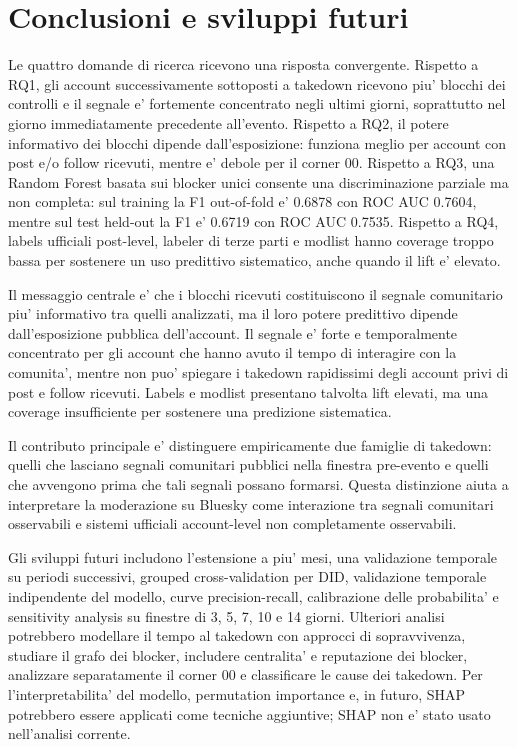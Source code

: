 \section{Conclusioni e sviluppi futuri}

Le quattro domande di ricerca ricevono una risposta convergente. Rispetto a RQ1, gli account successivamente sottoposti a takedown ricevono piu' blocchi dei controlli e il segnale e' fortemente concentrato negli ultimi giorni, soprattutto nel giorno immediatamente precedente all'evento. Rispetto a RQ2, il potere informativo dei blocchi dipende dall'esposizione: funziona meglio per account con post e/o follow ricevuti, mentre e' debole per il corner 00. Rispetto a RQ3, una Random Forest basata sui blocker unici consente una discriminazione parziale ma non completa: sul training la F1 out-of-fold e' \num{0.6878} con ROC AUC \num{0.7604}, mentre sul test held-out la F1 e' \num{0.6719} con ROC AUC \num{0.7535}. Rispetto a RQ4, labels ufficiali post-level, labeler di terze parti e modlist hanno coverage troppo bassa per sostenere un uso predittivo sistematico, anche quando il lift e' elevato.

Il messaggio centrale e' che i blocchi ricevuti costituiscono il segnale comunitario piu' informativo tra quelli analizzati, ma il loro potere predittivo dipende dall'esposizione pubblica dell'account. Il segnale e' forte e temporalmente concentrato per gli account che hanno avuto il tempo di interagire con la comunita', mentre non puo' spiegare i takedown rapidissimi degli account privi di post e follow ricevuti. Labels e modlist presentano talvolta lift elevati, ma una coverage insufficiente per sostenere una predizione sistematica.

Il contributo principale e' distinguere empiricamente due famiglie di takedown: quelli che lasciano segnali comunitari pubblici nella finestra pre-evento e quelli che avvengono prima che tali segnali possano formarsi. Questa distinzione aiuta a interpretare la moderazione su Bluesky come interazione tra segnali comunitari osservabili e sistemi ufficiali account-level non completamente osservabili.

Gli sviluppi futuri includono l'estensione a piu' mesi, una validazione temporale su periodi successivi, grouped cross-validation per DID, validazione temporale indipendente del modello, curve precision-recall, calibrazione delle probabilita' e sensitivity analysis su finestre di 3, 5, 7, 10 e 14 giorni. Ulteriori analisi potrebbero modellare il tempo al takedown con approcci di sopravvivenza, studiare il grafo dei blocker, includere centralita' e reputazione dei blocker, analizzare separatamente il corner 00 e classificare le cause dei takedown. Per l'interpretabilita' del modello, permutation importance e, in futuro, SHAP potrebbero essere applicati come tecniche aggiuntive; SHAP non e' stato usato nell'analisi corrente.

